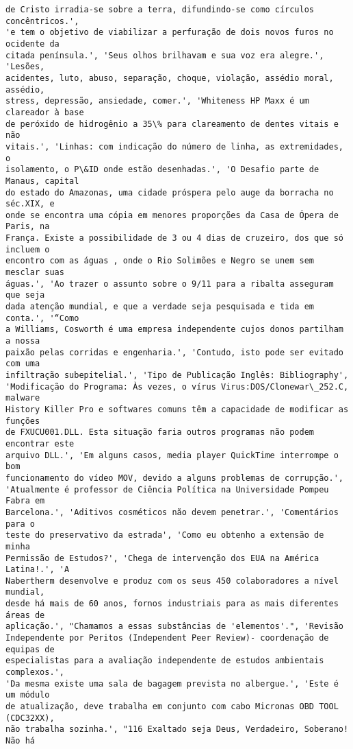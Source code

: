 \documentclass[10pt]{article}
\begin{document}
\begin{Verbatim}[commandchars=\\\{\}]
de Cristo irradia-se sobre a terra, difundindo-se como círculos concêntricos.',
'e tem o objetivo de viabilizar a perfuração de dois novos furos no ocidente da
citada península.', 'Seus olhos brilhavam e sua voz era alegre.', 'Lesões,
acidentes, luto, abuso, separação, choque, violação, assédio moral, assédio,
stress, depressão, ansiedade, comer.', 'Whiteness HP Maxx é um clareador à base
de peróxido de hidrogênio a 35\% para clareamento de dentes vitais e não
vitais.', 'Linhas: com indicação do número de linha, as extremidades, o
isolamento, o P\&ID onde estão desenhadas.', 'O Desafio parte de Manaus, capital
do estado do Amazonas, uma cidade próspera pelo auge da borracha no séc.XIX, e
onde se encontra uma cópia em menores proporções da Casa de Ópera de Paris, na
França. Existe a possibilidade de 3 ou 4 dias de cruzeiro, dos que só incluem o
encontro com as águas , onde o Rio Solimões e Negro se unem sem mesclar suas
águas.', 'Ao trazer o assunto sobre o 9/11 para a ribalta asseguram que seja
dada atenção mundial, e que a verdade seja pesquisada e tida em conta.', '“Como
a Williams, Cosworth é uma empresa independente cujos donos partilham a nossa
paixão pelas corridas e engenharia.', 'Contudo, isto pode ser evitado com uma
infiltração subepitelial.', 'Tipo de Publicação Inglês: Bibliography',
'Modificação do Programa: Às vezes, o vírus Virus:DOS/Clonewar\_252.C, malware
History Killer Pro e softwares comuns têm a capacidade de modificar as funções
de FXUCU001.DLL. Esta situação faria outros programas não podem encontrar este
arquivo DLL.', 'Em alguns casos, media player QuickTime interrompe o bom
funcionamento do vídeo MOV, devido a alguns problemas de corrupção.',
'Atualmente é professor de Ciência Política na Universidade Pompeu Fabra em
Barcelona.', 'Aditivos cosméticos não devem penetrar.', 'Comentários para o
teste do preservativo da estrada', 'Como eu obtenho a extensão de minha
Permissão de Estudos?', 'Chega de intervenção dos EUA na América Latina!.', 'A
Nabertherm desenvolve e produz com os seus 450 colaboradores a nível mundial,
desde há mais de 60 anos, fornos industriais para as mais diferentes áreas de
aplicação.', "Chamamos a essas substâncias de 'elementos'.", 'Revisão
Independente por Peritos (Independent Peer Review)- coordenação de equipas de
especialistas para a avaliação independente de estudos ambientais complexos.',
'Da mesma existe uma sala de bagagem prevista no albergue.', 'Este é um módulo
de atualização, deve trabalha em conjunto com cabo Micronas OBD TOOL (CDC32XX),
não trabalha sozinha.', "116 Exaltado seja Deus, Verdadeiro, Soberano! Não há

\end{Verbatim}
\end{document}
